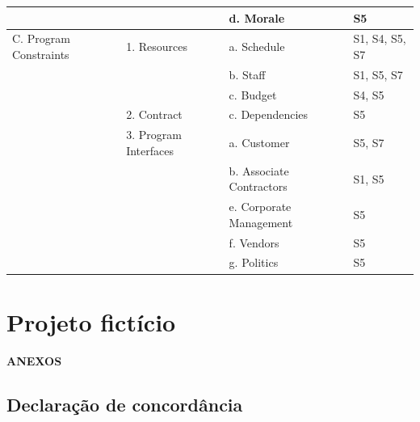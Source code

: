 \documentclass[
	12pt,
	openright,
	twoside,
	a4paper,
	english,
	brazil
	]{abntex2}
\begin{document}
\begin{apendices}
\begin{longtable}{|>{\raggedright\arraybackslash}p{2.4cm}|p{4.5cm}|p{4.7cm}|l|}
  \cline{3-4}
  & & d. Morale & S5 \\
  \hline
  C. Program Constraints & 1. Resources & a. Schedule & S1, S4, S5, S7 \\
  \cline{3-4}
  & & b. Staff & S1, S5, S7 \\
  \cline{3-4}
  & & c. Budget & S4, S5 \\
  \cline{2-4}
  & 2. Contract & c. Dependencies & S5 \\
  \cline{2-4}
  & 3. Program Interfaces & a. Customer & S5, S7 \\
  \cline{3-4}
  & & b. Associate Contractors & S1, S5 \\
  \cline{3-4}
  & & e. Corporate Management & S5 \\
  \cline{3-4}
  & & f. Vendors & S5 \\
  \cline{3-4}
  & & g. Politics & S5 \\
  \hline
\end{longtable}

\chapter{Projeto fictício}
\label{apendiceD}



\end{apendices} %


{}
\thispagestyle{empty}
\vspace*{\fill}
\begin{center}
    \textbf{\Huge ANEXOS}
\end{center}
\vspace*{\fill}
\cleardoublepage


\begin{anexos}

    \chapter{Declaração de concordância}
    \label{anexo:declaracao-concordancia}
    

\end{anexos}


\printindex

\end{document}
